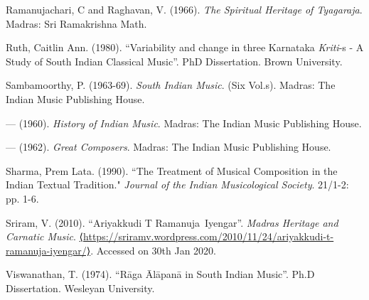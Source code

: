 \begin{thebibliography}{99}
  Ramanujachari, C and Raghavan, V. (1966). \textit{The Spiritual Heritage of Tyagaraja}. Madras: Sri Ramakrishna Math.

  Ruth, Caitlin Ann. (1980). “Variability and change in three Karnataka \textit{Kriti}-s - A Study of South Indian Classical Music”. PhD Dissertation. Brown University.

  Sambamoorthy, P. (1963-69). \textit{South Indian Music}. (Six Vol.s). Madras: The Indian Music Publishing House.

  — (1960). \textit{History of Indian Music}. Madras: The Indian Music Publishing House.

  — (1962). \textit{Great Composers}. Madras: The Indian Music Publishing House.

  Sharma, Prem Lata. (1990). ``The Treatment of Musical Composition in the Indian Textual Tradition." \textit{Journal of the Indian Musicological Society}. 21/1-2: pp. 1-6.

  Sriram, V. (2010). “Ariyakkudi T Ramanuja Iyengar”. \textit{Madras Heritage and Carnatic Music}. \url{⟨https://sriramv.wordpress.com/2010/11/24/ariyakkudi-t-ramanuja-iyengar/⟩}. Accessed on 30th Jan 2020.

  Viswanathan, T. (1974). “Rāga Ālāpanā in South Indian Music”. Ph.D Dissertation. Wesleyan University.

 \end{thebibliography}


